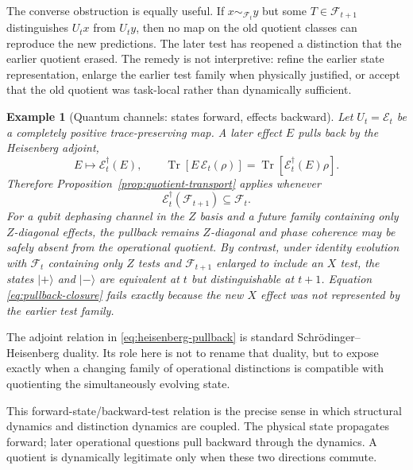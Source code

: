 \documentclass[11pt]{article}
\newtheorem{example}[definition]{Example}
\newcommand{\F}{\mathcal F}
\newcommand{\Tr}{\operatorname{Tr}}
\begin{document}
The converse obstruction is equally useful. If $x\sim_{\F_t}y$ but some $T\in\F_{t+1}$ distinguishes $U_t x$ from $U_t y$, then no map on the old quotient classes can reproduce the new predictions. The later test has reopened a distinction that the earlier quotient erased. The remedy is not interpretive: refine the earlier state representation, enlarge the earlier test family when physically justified, or accept that the old quotient was task-local rather than dynamically sufficient.

\begin{example}[Quantum channels: states forward, effects backward]
Let $U_t=\mathcal E_t$ be a completely positive trace-preserving map. A later effect $E$ pulls back by the Heisenberg adjoint,
\begin{equation}
  E\longmapsto \mathcal E_t^{\dagger}(E),
  \qquad
  \Tr[E\,\mathcal E_t(\rho)]
  =
  \Tr[\mathcal E_t^{\dagger}(E)\rho].
  \label{eq:heisenberg-pullback}
\end{equation}
Therefore Proposition~\ref{prop:quotient-transport} applies whenever
\begin{equation}
  \mathcal E_t^{\dagger}(\F_{t+1})\subseteq\F_t.
  \label{eq:quantum-pullback-closure}
\end{equation}
For a qubit dephasing channel in the $Z$ basis and a future family containing only $Z$-diagonal effects, the pullback remains $Z$-diagonal and phase coherence may be safely absent from the operational quotient. By contrast, under identity evolution with $\F_t$ containing only $Z$ tests and $\F_{t+1}$ enlarged to include an $X$ test, the states $|+\rangle$ and $|-\rangle$ are equivalent at $t$ but distinguishable at $t+1$. Equation \eqref{eq:pullback-closure} fails exactly because the new $X$ effect was not represented by the earlier test family.
\end{example}

The adjoint relation in \eqref{eq:heisenberg-pullback} is standard Schrödinger--Heisenberg duality. Its role here is not to rename that duality, but to expose exactly when a changing family of operational distinctions is compatible with quotienting the simultaneously evolving state.

This forward-state/backward-test relation is the precise sense in which structural dynamics and distinction dynamics are coupled. The physical state propagates forward; later operational questions pull backward through the dynamics. A quotient is dynamically legitimate only when these two directions commute.
\end{document}

